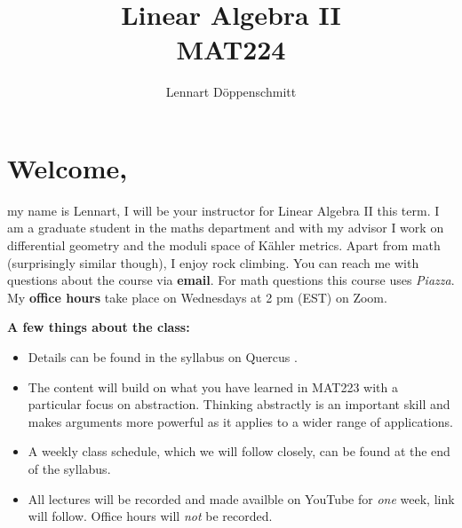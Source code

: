\documentclass[letterpaper, 10pt]{article}
\begin{document}

\title{Linear Algebra II \\ \Large{MAT224}}
\author{Lennart Döppenschmitt}
\maketitle


\section*{Welcome,}%
my name is Lennart, I will be your instructor for Linear Algebra II this term.
I am a graduate student in the maths department and with my advisor I work on differential
geometry and the moduli space of Kähler metrics.
Apart from math (surprisingly similar though), I enjoy rock climbing.
\lb
You can reach me with questions about the course via \textbf{email}.
For math questions this course uses \emph{Piazza}.
\lb
My \textbf{office hours} take place on Wednesdays at 2 pm (EST) on Zoom.

\lb
\lb
\textbf{A few things about the class:}
\begin{itemize}
    \item
        Details can be found in the syllabus on Quercus
        \href{https://q.utoronto.ca}
        {}.


    \item The content will build on what you have learned in MAT223 with a
        particular focus on abstraction. Thinking abstractly is an important skill and
        makes arguments more powerful as it applies to a wider range of applications.

    \item
        A weekly class schedule, which we will follow closely, can be found at
        the end of the syllabus.

    \item
        All lectures will be recorded and made availble on YouTube for
        \emph{one} week, link will follow.
        Office hours will \emph{not} be recorded.
\end{itemize}
\end{document}
